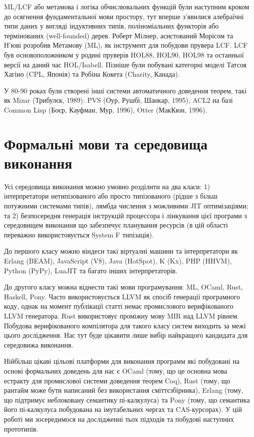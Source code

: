 ML/LCF або метамова і логіка обчислювальних функцій були наступним кроком до
осягнення фундаментальної мови простору, тут вперше з'явилися алебраїчні типи даних
у вигляді індуктивних типів, поліноміальних функторів або термінованих (well-founded) дерев.
Роберт Мілнер, асистований Морісом та Н'юві розробив Метамову (ML), як
інструмент для побудови прувера LCF. LCF був основоположником у родині пруверів
HOL88, HOL90, HOL98 та останньої версії на даний час HOL/Isabell.
Пізніше були побувані категорні моделі Татсоя Хагіно (CPL, Японія)
та Робіна Кокета (Charity, Канада).

У 80-90 роках були створені інші системи автоматичного доведення теорем,
такі як Mizar (Трибулєк, 1989). PVS (Оур, Рушбі, Шанкар, 1995),
ACL2 на базі Common Lisp (Боєр, Кауфман, Мур, 1996), Otter (МакКюн, 1996).

\section{Формальні мови та середовища виконання}
Усі середовища виконання можно умовно розділити на два класи:
1) інтерпретатори нетипізованого або просто
   типізованого (рідше з більш потужними системами типів),
   лямбда числення з можливими JIT оптимізаціями; та
2) безпосередня генерація інструкцій процессора і лінкування цієї програми з
   середовищем виконання що забезпечує планування ресурсів (в цій області
   переважно використовується System F типізація).

До першого класу можно віндеси такі віртуалні машини та інтерпретатори як
Erlang (BEAM), JavaScript (V8), Java (HotSpot), K (Kx), PHP (HHVM), Python (PyPy), LuaJIT
та багато інших інтерпретаторів.

До другого класу можна віднести такі мови програмування: ML, OCaml, Rust,
Haskell, Pony. Часто використовується LLVM як спосіб генерації програмного коду,
однак на момент публікації статті немає промислового верифікованого LLVM генератора.
Rust використовує проміжну мову MIR над LLVM рівнем. Побудова верифікованого компілятора
для такого класу систем виходить за межі цього дослідження. Нас тут буде цікавити
лише вибір найкращого кандидата для середовижа виконання.

Нійбільш цікаві цільові платформи для виконання программ
які побудовані на основі формальних доведень для нас є OCaml (тому,
що це основна мова естракту для промислової системи доведення теорем Coq),
Rust (тому, що рантайм може бути написаний без використання сміттєзбірника),
Erlang (тому, що підтримує неблоковану семантику пі-калкулуса)
та Pony (тому, що семантика його пі-калкулуса побудована на імутабельних чергах та CAS-курсорах).
У цій роботі ми зосередимося на дослідженні тьох підходів та побудові наступних прототипів.

